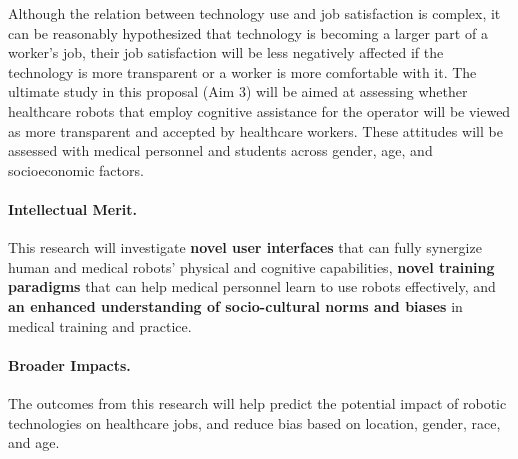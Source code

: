 Although the relation between technology use and job satisfaction is complex, it can be reasonably hypothesized that technology is becoming a larger part of a worker’s job, their job satisfaction will be less negatively affected if the technology is more transparent or a worker is more comfortable with it. The ultimate study in this proposal (Aim 3) will be aimed at assessing whether healthcare robots that employ cognitive assistance for the operator will be viewed as more transparent and accepted by healthcare workers. These attitudes will be assessed with medical personnel and students across gender, age, and socioeconomic factors.









\paragraph*{Intellectual Merit.}
This research will investigate \textbf{novel user interfaces} that can fully synergize human and medical robots' physical and cognitive capabilities, \textbf{novel training paradigms} that can help medical personnel learn to use robots effectively, and \textbf{an enhanced understanding of socio-cultural norms and biases} in medical training and practice. 

\paragraph*{Broader Impacts.}  The outcomes from this research will help predict the potential impact of robotic technologies on healthcare jobs, and reduce bias based on location, gender, race, and age.

